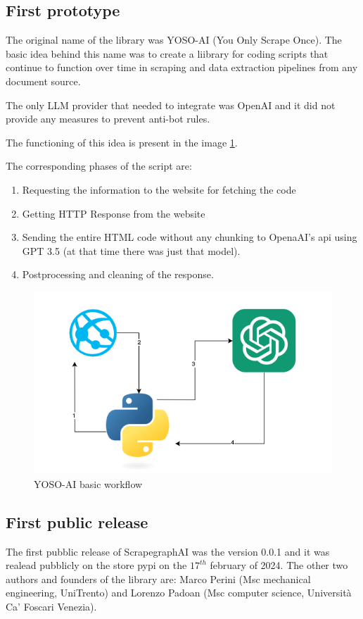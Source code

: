 \subsection{First prototype}

The original name of the library was YOSO-AI (You Only Scrape Once). The basic idea behind this name was to create a liibrary for coding scripts that continue to function over time in scraping and data extraction pipelines from any document source.

The only LLM provider that needed to integrate was OpenAI and it did not provide any measures to prevent anti-bot rules.

The functioning of this idea is present in the image 
\ref{fig:yoso}.

The corresponding phases of the script are:
\begin{enumerate}
    \item Requesting the information to the website for fetching the code
    \item Getting HTTP Response from the website
    \item Sending the entire HTML code without any chunking to OpenaAI's api using GPT 3.5 (at that time there was just that model). 
    \item Postprocessing and cleaning of the response. 
\end{enumerate}

\begin{figure}[h!]
    \centering
    \includegraphics[scale=0.7]{Assets/YOSO.png}
    \caption{YOSO-AI basic workflow}
    \label{fig:yoso}
\end{figure}

\subsection{First public release}
The first pubblic release of ScrapegraphAI  was the version 0.0.1 and it was realead pubblicly on the store pypi on the $17^{th}$ february of 2024. The other two authors and founders of the library are: Marco Perini (Msc mechanical engineering, UniTrento) and Lorenzo Padoan (Msc computer science, Università Ca'​ Foscari Venezia).

